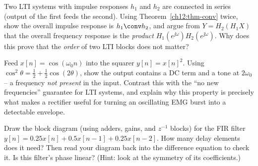 \begin{exercise}
Two LTI systems with impulse responses $h_1$ and $h_2$ are connected in series
(output of the first feeds the second). Using Theorem~\ref{ch12:thm-conv} twice,
show the overall impulse response is $h_1\conv h_2$, and argue from
$Y=H_2(H_1 X)$ that the overall frequency response is the \emph{product}
$H_1(e^{\jj\omega})H_2(e^{\jj\omega})$. Why does this prove that the \emph{order}
of two LTI blocks does not matter?
\end{exercise}

\begin{exercise}
Feed $x[n]=\cos(\omega_0 n)$ into the squarer $y[n]=x[n]^2$. Using
$\cos^2\theta=\tfrac12+\tfrac12\cos(2\theta)$, show the output contains a DC term
and a tone at $2\omega_0$ -- a frequency \emph{not present} in the input.
Contrast this with the ``no new frequencies'' guarantee for LTI systems, and
explain why this property is precisely what makes a rectifier useful for turning
an oscillating EMG burst into a detectable envelope.
\end{exercise}

\begin{exercise}
Draw the block diagram (using adders, gains, and $z^{-1}$ blocks) for the FIR
filter $y[n]=0.25x[n]+0.5x[n-1]+0.25x[n-2]$. How many delay elements does it
need? Then read your diagram back into the difference equation to check it. Is
this filter's phase linear? (Hint: look at the symmetry of its coefficients.)
\end{exercise}
